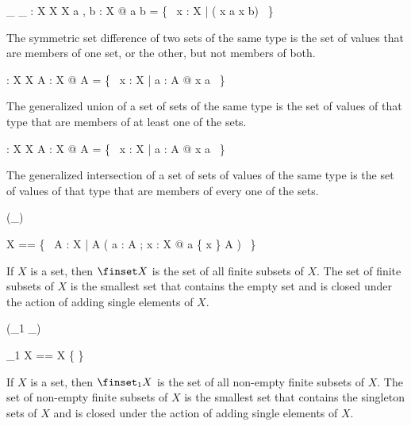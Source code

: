 \documentclass[draft,a4paper,10pt,wd]{isov2}
\begin{document}
\begin{gendef}[X]
\_ \symdiff \_ : \power X \cross \power X \fun \power X
\where
\forall a , b : \power X @ a \symdiff b = \{~ x : X | \lnot ( x \in a \iff x \in b) ~\}
\end{gendef}

The symmetric set difference of two sets of the same type is
the set of values that are members of one set, or the other,
but not members of both.


\begin{gendef}[X]
\bigcup : \power \power X  \fun \power X
\where
\forall A : \power \power X @ \bigcup A = \{~ x : X | \exists a : A @ x \in a ~\}
\end{gendef}

The generalized union of a set of sets of the same type is
the set of values of that type that are members of at least one of the sets.


\begin{gendef}[X]
\bigcap : \power \power X \fun \power X
\where
\forall A : \power \power X @ \bigcap A = \{~ x : X | \forall a : A @ x \in a ~\}
\end{gendef}

The generalized intersection of a set of sets of values of the same
type is the set of values of that type that are members of
every one of the sets.



\begin{zed}
\generic (\finset \_)
\end{zed}

\begin{zed}
\finset X == \bigcap \{~ A : \power \power X |
	\emptyset \in A \land ( \forall a : A ; x : X @ a \cup \{ x \} \in A ) ~\}
\end{zed}

If $X$ is a set,
then $\finset X$ is the set of all finite subsets of $X$.
The set of finite subsets of $X$ is the smallest set that contains the empty set
and is closed under the action of adding single elements of $X$.


\begin{zed}
\generic (\finset_1 \_)
\end{zed}

\begin{zed}
\finset_1 X == \finset X \setminus \{ \emptyset \}
\end{zed}

If $X$ is a set,
then $\finset_1 X$ is the set of all non-empty finite subsets of $X$.
The set of non-empty finite subsets of $X$ is the smallest set that contains
the singleton sets of $X$ and is closed under the action of adding single
elements of $X$.
\end{document}
